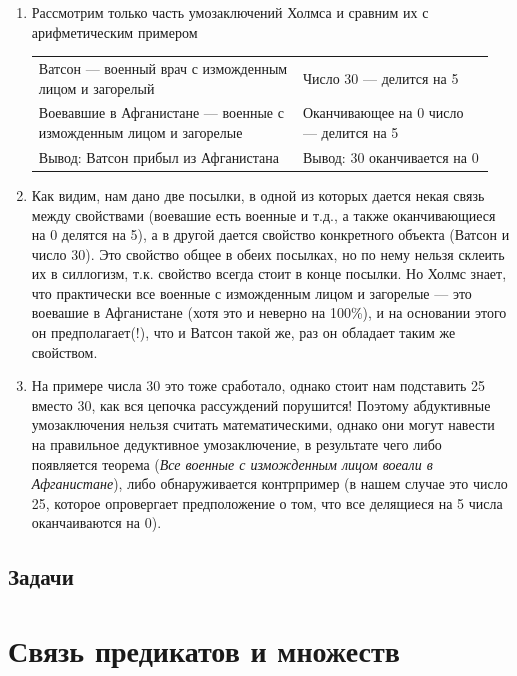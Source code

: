 \begin{enumerate}
\item Рассмотрим только часть умозаключений Холмса и сравним их с арифметическим примером\hfill\;

\begin{tabular}{p{0.55\linewidth}p{0.4\linewidth}}\hline
Ватсон --- военный врач с изможденным лицом и загорелый & 
Число 30 --- делится на 5 \\
Воевавшие в Афганистане --- военные с изможденным лицом и загорелые &
Оканчивающее на 0 число --- делится на 5 \\\hline

Вывод: Ватсон прибыл из Афганистана & Вывод: 30 оканчивается на 0\\\hline
\end{tabular}

\item Как видим, нам дано две посылки, в одной из которых дается некая связь между свойствами (воевашие есть военные и т.д., а также оканчивающиеся на 0 делятся на 5), а в другой дается свойство конкретного объекта (Ватсон и число 30). Это свойство общее в обеих посылках, но по нему нельзя склеить их в силлогизм, т.к. свойство всегда стоит в конце посылки. Но Холмс знает, что практически все военные с изможденным лицом и загорелые --- это воевашие в Афганистане (хотя это и неверно на 100\%), и на основании этого он предполагает(!), что и Ватсон такой же, раз он обладает таким же свойством.

\item На примере числа 30 это тоже сработало, однако стоит нам подставить 25 вместо 30, как вся цепочка рассуждений порушится! Поэтому абдуктивные умозаключения нельзя считать математическими, однако они могут навести на правильное дедуктивное умозаключение, в результате чего либо появляется теорема (\textit{Все военные с изможденным лицом воеали в Афганистане}), либо обнаруживается контрпример (в нашем случае это число 25, которое опровергает предположение о том, что все делящиеся на 5 числа оканчаиваются на 0).
\end{enumerate}

\subsection{Задачи}



\section{Связь предикатов и множеств}

